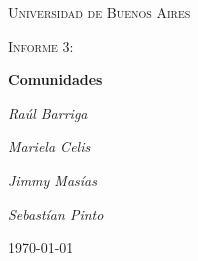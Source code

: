 \documentclass[11pt, spanish]{article}
\begin{document}
\begin{titlepage}
    \centering
    {\scshape\LARGE Universidad de Buenos Aires \par}
    \vspace{1cm}
    {\scshape\Large Informe 3:\par}

    \vspace{1.5cm}
    {\scshape\Large\par}
    {\huge\bfseries  Comunidades\par}
    \vspace{2cm}
    {\Large\itshape Ra\'ul Barriga\par}
    {\Large\itshape Mariela Celis\par}
    {\Large\itshape Jimmy Mas\'ias\par}
    {\Large\itshape Sebast\'ian Pinto\par}

    \vfill

    \vfill

    {\large \today\par}
\end{titlepage}

    \tableofcontents

    
    
    
    

%
%
\end{document}
